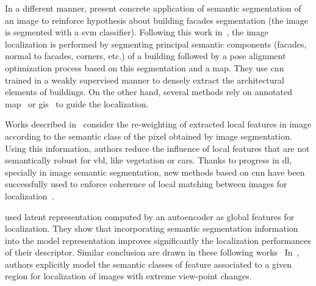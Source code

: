  			 In a different manner, \citet{Arth2015} present concrete application of semantic segmentation of an image to reinforce hypothesis about building facades segmentation (the image is segmented with a \ac{svm} classifier). Following this work in~\citep{Armagan2017a,Armagan2017b,Armagan2017}, the image localization is performed by segmenting principal semantic components (facades, normal to facades, corners, etc.) of a building followed by a pose alignment optimization process based on this segmentation and a map. They use \ac{cnn} trained in a weakly supervised manner to densely extract the architectural elements of buildings. On the other hand, several methods rely on annotated map~\citep{Atanasov2016,Wang2015} or \ac{gis}~\citep{Ardeshir2014,Castaldo2015,Qu2015} to guide the localization.
 			
			 Works described in~\citep{Arandjelovic2014a,Mousavian2015} consider the re-weighting of extracted local features in image according to the semantic class of the pixel obtained by image segmentation. Using this information, authors reduce the influence of local features that are not semantically robust for \ac{vbl}, like vegetation or cars. Thanks to progress in \ac{dl}, specially in image semantic segmentation, new methods based on \ac{cnn} have been successfully used to enforce coherence of local matching between images for localization~\citep{Shi2019,Toft2018}.			 
			 
			 \citet{Schonberger2017a} used latent representation computed by an autoencoder as global features for localization. They show that incorporating semantic segmentation information into the model representation improves significantly the localization performances of their descriptor. Similar conclusion are drawn in these following works~\citep{Seymour2018,Radwan2018} In~\citep{Garg2018,Garg2018a}, authors explicitly model the semantic classes of feature associated to a given region for localization of images with extreme view-point changes.
	    	
